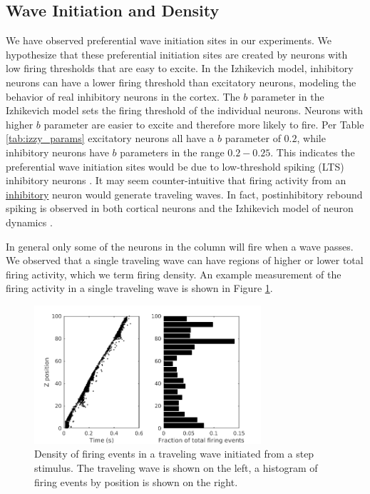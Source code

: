 \documentclass[a4paper,11pt]{article}
\begin{document}
\subsection{Wave Initiation and Density} \label{sub:wave_initiation}
We have observed preferential wave initiation sites in our experiments.
We hypothesize that these preferential initiation sites are created by neurons with low firing thresholds that are easy to excite.
In the Izhikevich model, inhibitory neurons can have a lower firing threshold than excitatory neurons, modeling the behavior of real inhibitory neurons in the cortex\cite{gibson2009}.
The $b$ parameter in the Izhikevich model sets the firing threshold of the individual neurons.
Neurons with higher $b$ parameter are easier to excite and therefore more likely to fire.
Per Table \ref{tab:izzy_params} excitatory neurons all have a $b$ parameter of $0.2$, while inhibitory neurons have $b$ parameters in the range $0.2-0.25$.
This indicates the preferential wave initiation sites would be due to low-threshold spiking (LTS) inhibitory neurons \cite{izhikevich2003}.
It may seem counter-intuitive that firing activity from an \underline{inhibitory} neuron would generate traveling waves.
In fact, postinhibitory rebound spiking is observed in both cortical neurons \cite{ascoli2010} and the Izhikevich model of neuron dynamics \cite{izhikevich}.

In general only some of the neurons in the column will fire when a wave passes.
We observed that a single traveling wave can have regions of higher or lower total firing activity, which we term firing density.
An example measurement of the firing activity in a single traveling wave is shown in Figure \ref{fig:wave_density}.
\begin{figure}[!htb]
 \caption{Density of firing events in a traveling wave initiated from a step stimulus. The traveling wave is shown on the left, a histogram of firing events by position is shown on the right.}
 \label{fig:wave_density}
 \centering
   \includegraphics[width=0.75\textwidth]{fig/ImpulseWaveDensity}
\end{figure}
\end{document}
